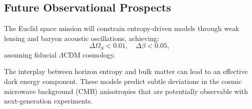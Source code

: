 \subsection{Future Observational Prospects}

\begin{theorem}
The Euclid space mission will constrain entropy-driven models through weak lensing and baryon acoustic oscillations, achieving:
\[
\Delta \Omega_S < 0.01, \quad \Delta \beta < 0.05,
\]
assuming fiducial $\Lambda$CDM cosmology.
\end{theorem}

\begin{remark}
The interplay between horizon entropy and bulk matter can lead to an effective dark energy component. These models predict subtle deviations in the cosmic microwave background (CMB) anisotropies that are potentially observable with next-generation experiments.
\end{remark}
